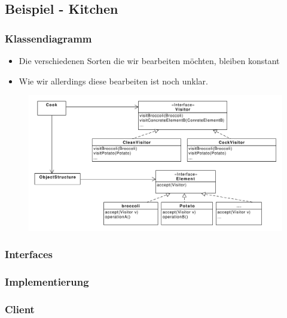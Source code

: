\subsection{Beispiel - Kitchen}
\begin{frame}
	\frametitle{Klassendiagramm}
	\begin{itemize}
		\item Die verschiedenen Sorten die wir bearbeiten möchten, bleiben konstant
		\item Wie wir allerdings diese bearbeiten ist noch unklar.
	\end{itemize}	
	
  	\begin{figure}
		\includegraphics[scale=.3]{paper/visitor/kitchen}
	\end{figure}
\end{frame}



\begin{frame}
	\frametitle{Interfaces}
  	\begin{figure}
	\end{figure}
\end{frame}

\begin{frame}
	\frametitle{Implementierung}
  	\begin{figure}
	\end{figure}
\end{frame}

\begin{frame}
	\frametitle{Client}
  	\begin{figure}
	\end{figure}
\end{frame}

